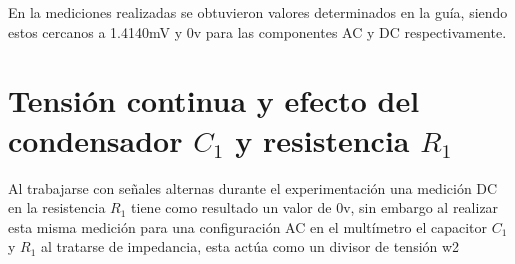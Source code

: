 \documentclass[conference]{IEEEtran}
\begin{document}
	En la mediciones realizadas se obtuvieron valores determinados en la guía, siendo estos cercanos a 1.4140mV y 0v para las componentes AC y DC respectivamente.
	
	\section{Tensión continua y efecto del condensador $C_1$ y resistencia $R_1$}
	
	Al trabajarse con señales alternas durante el experimentación una medición DC en la resistencia $R_1$ tiene como resultado un valor de 0v, sin embargo al realizar esta misma medición para una configuración AC en el multímetro el capacitor $C_1$ y $R_1$ al tratarse de impedancia, esta actúa como un divisor de tensión w2 
	
	
	
	
	
\end{document}
